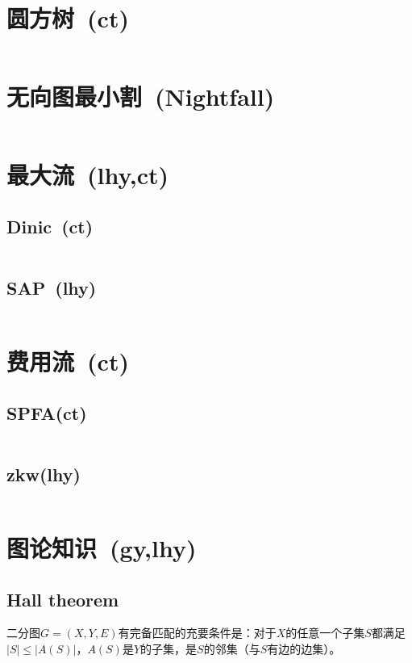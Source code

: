 \section{圆方树\ \small(ct)}
	\inputminted{cpp}{graph_theory/circle_square_tree.cpp}
\section{无向图最小割\ \small(Nightfall)}
	\inputminted{cpp}{graph_theory/stoer_wagner.cpp}
\section{最大流\ \small(lhy,ct)}
	\subsection*{Dinic\ \small(ct)}
		\inputminted{cpp}{graph_theory/dinic.cpp}
	\subsection*{SAP\ \small(lhy)}
		\inputminted{cpp}{graph_theory/sap.cpp}
\section{费用流\ \small(ct)}
	\subsection*{SPFA(ct)}
		\inputminted{cpp}{graph_theory/min_cost_max_flow.cpp}
	\subsection*{zkw(lhy)}
		\inputminted{cpp}{graph_theory/zkw_min_cost_flow.cpp}
\section{图论知识\ \small(gy,lhy)}
	\subsection*{Hall theorem}
		二分图$ G = (X, Y, E) $有完备匹配的充要条件是：对于$ X $的任意一个子集$ S $都满足$ \left| S \right| \leq \left| A(S) \right| $，$ A(S) $是$ Y $的子集，是$ S $的邻集（与$ S $有边的边集）。
